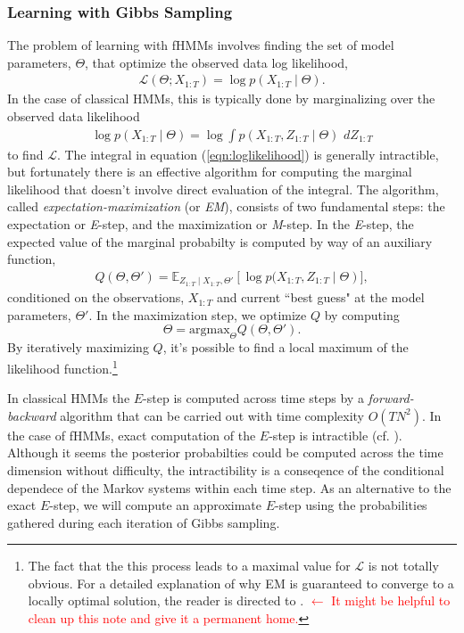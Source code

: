 \documentclass{amsart}
\begin{document}
\subsubsection{Learning with Gibbs Sampling}\label{sec:learningGibbs}
The problem of learning with fHMMs involves finding the set of model parameters, $\Theta$, that optimize the observed data log likelihood, 
\begin{eqnarray*}
\mathcal L(\Theta;X_{1:T}) = \log p(X_{1:T}\mid \Theta).
\end{eqnarray*}
In the case of classical HMMs, this is typically done by marginalizing over the observed data likelihood
\begin{eqnarray}\label{eqn:loglikelihood}
\log p(X_{1:T}\mid \Theta) = \log\int p(X_{1:T},Z_{1:T}\mid \Theta)\,\,dZ_{1:T}
\end{eqnarray}
to find $\mathcal L$.  The integral in equation (\ref{eqn:loglikelihood}) is generally intractible, 
but fortunately there is an effective algorithm for computing the marginal likelihood that 
doesn't involve direct evaluation of the integral.  The algorithm, called 
{\em expectation-maximization} (or {\em EM}), consists of two 
fundamental steps: the expectation or {\em E}-step, and the maximization or 
{\em M}-step.  In the {\em E}-step, the expected value of the marginal probabilty is computed 
by way of an auxiliary function,
\begin{eqnarray}
Q(\Theta,\Theta') = \mathbb E_{Z_{1:T}\mid X_{1:T},\Theta'}\left[\log p(X_{1:T},Z_{1:T}\mid \Theta\right)],
\end{eqnarray}
conditioned on the observations, $X_{1:T}$ and current ``best guess" at the model parameters, $\Theta'$.  In the maximization step, we optimize $Q$ by computing 
\[
\Theta = \text{argmax}_{\Theta}Q(\Theta,\Theta').
\]
By iteratively maximizing $Q$, it's possible to find a local maximum of the likelihood function.\footnote{The fact that the this process leads to a maximal value for $\mathcal L$ is not totally obvious.  For a detailed explanation of why EM is guaranteed to converge to a locally optimal solution, the reader is directed to \cite[$\S2.2$]{HVB20}. \textcolor{red}{$\leftarrow$ It might be helpful to clean up this note and give it a permanent home.}}

In classical HMMs the $E$-step is computed across time steps by a {\em forward-backward} 
algorithm that can be carried out with time complexity $O(TN^2)$.  In the case of 
fHMMs, exact computation of the $E$-step is intractible (cf. \cite[$\S3.3$]{GJ95}).  
Although it seems the posterior probabilties could be computed across the time 
dimension without difficulty, the intractibility is a conseqence of the conditional 
dependece of the Markov systems within each time step.  As an alternative to the 
exact $E$-step, we will compute an approximate $E$-step using the probabilities 
gathered during each iteration of Gibbs sampling.  
\end{document}

